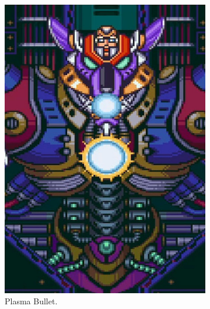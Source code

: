 \begin{figure}[htp]
\begin{subfigure}[t]{0.3\linewidth}
		\includegraphics[width=\linewidth]{figures/X1/Sigma_stages/WolfSigma_plasma.jpg}
		\caption{Plasma Bullet.}
	\end{subfigure}
	\begin{subfigure}[t]{0.3\linewidth}
		\centering

\end{subfigure}
\end{figure}
